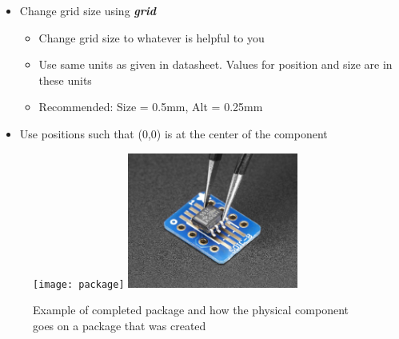 \documentclass{article}
\begin{document}
\begin{tcolorbox} [title=Tips \& Tricks]
    \begin{itemize}
        \item Change grid size using \textit{\textbf{grid}}
        \begin{itemize}
            \item Change grid size to whatever is helpful to you
            \item Use same units as given in datasheet. Values for position and size are in these units
            \item Recommended: Size = 0.5mm, Alt = 0.25mm
        \end{itemize}
        \item Use positions such that (0,0) is at the center of the component
    \end{itemize}
\end{tcolorbox}

\begin{figure}[!h]
    \center
    \texttt{[image: package]}
    \includegraphics[width=0.5\textwidth,height=0.5\textheight,keepaspectratio]{package2}
    \caption {Example of completed package and how the physical component goes on a package that was created}
    \label{img:package1}
\end{figure}
\end{document}
